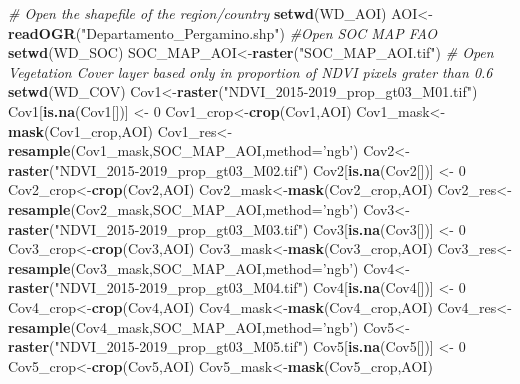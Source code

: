 \documentclass[
  10pt,
  b5paper,
]{book}
\newenvironment{Shaded}{\begin{snugshade}}{\end{snugshade}}
\newcommand{\CommentTok}[1]{\textcolor[rgb]{0.56,0.35,0.01}{\textit{#1}}}
\newcommand{\DataTypeTok}[1]{\textcolor[rgb]{0.13,0.29,0.53}{#1}}
\newcommand{\DecValTok}[1]{\textcolor[rgb]{0.00,0.00,0.81}{#1}}
\newcommand{\KeywordTok}[1]{\textcolor[rgb]{0.13,0.29,0.53}{\textbf{#1}}}
\newcommand{\NormalTok}[1]{#1}
\newcommand{\StringTok}[1]{\textcolor[rgb]{0.31,0.60,0.02}{#1}}
\begin{document}
\begin{Shaded}
\begin{Highlighting}[]
\CommentTok{# Open the shapefile of the region/country}
\KeywordTok{setwd}\NormalTok{(WD_AOI)}
\NormalTok{AOI<-}\KeywordTok{readOGR}\NormalTok{(}\StringTok{"Departamento_Pergamino.shp"}\NormalTok{)}
\CommentTok{#Open SOC MAP FAO}
\KeywordTok{setwd}\NormalTok{(WD_SOC)}
\NormalTok{SOC_MAP_AOI<-}\KeywordTok{raster}\NormalTok{(}\StringTok{"SOC_MAP_AOI.tif"}\NormalTok{)}
\CommentTok{# Open Vegetation Cover layer based only in proportion of NDVI pixels grater than 0.6 }
\KeywordTok{setwd}\NormalTok{(WD_COV)}
\NormalTok{Cov1<-}\KeywordTok{raster}\NormalTok{(}\StringTok{"NDVI_2015-2019_prop_gt03_M01.tif"}\NormalTok{)}
\NormalTok{Cov1[}\KeywordTok{is.na}\NormalTok{(Cov1[])] <-}\StringTok{ }\DecValTok{0}
\NormalTok{Cov1_crop<-}\KeywordTok{crop}\NormalTok{(Cov1,AOI)}
\NormalTok{Cov1_mask<-}\KeywordTok{mask}\NormalTok{(Cov1_crop,AOI)}
\NormalTok{Cov1_res<-}\KeywordTok{resample}\NormalTok{(Cov1_mask,SOC_MAP_AOI,}\DataTypeTok{method=}\StringTok{'ngb'}\NormalTok{) }
\NormalTok{Cov2<-}\KeywordTok{raster}\NormalTok{(}\StringTok{"NDVI_2015-2019_prop_gt03_M02.tif"}\NormalTok{)}
\NormalTok{Cov2[}\KeywordTok{is.na}\NormalTok{(Cov2[])] <-}\StringTok{ }\DecValTok{0}
\NormalTok{Cov2_crop<-}\KeywordTok{crop}\NormalTok{(Cov2,AOI)}
\NormalTok{Cov2_mask<-}\KeywordTok{mask}\NormalTok{(Cov2_crop,AOI)}
\NormalTok{Cov2_res<-}\KeywordTok{resample}\NormalTok{(Cov2_mask,SOC_MAP_AOI,}\DataTypeTok{method=}\StringTok{'ngb'}\NormalTok{) }
\NormalTok{Cov3<-}\KeywordTok{raster}\NormalTok{(}\StringTok{"NDVI_2015-2019_prop_gt03_M03.tif"}\NormalTok{)}
\NormalTok{Cov3[}\KeywordTok{is.na}\NormalTok{(Cov3[])] <-}\StringTok{ }\DecValTok{0}
\NormalTok{Cov3_crop<-}\KeywordTok{crop}\NormalTok{(Cov3,AOI)}
\NormalTok{Cov3_mask<-}\KeywordTok{mask}\NormalTok{(Cov3_crop,AOI)}
\NormalTok{Cov3_res<-}\KeywordTok{resample}\NormalTok{(Cov3_mask,SOC_MAP_AOI,}\DataTypeTok{method=}\StringTok{'ngb'}\NormalTok{) }
\NormalTok{Cov4<-}\KeywordTok{raster}\NormalTok{(}\StringTok{"NDVI_2015-2019_prop_gt03_M04.tif"}\NormalTok{)}
\NormalTok{Cov4[}\KeywordTok{is.na}\NormalTok{(Cov4[])] <-}\StringTok{ }\DecValTok{0}
\NormalTok{Cov4_crop<-}\KeywordTok{crop}\NormalTok{(Cov4,AOI)}
\NormalTok{Cov4_mask<-}\KeywordTok{mask}\NormalTok{(Cov4_crop,AOI)}
\NormalTok{Cov4_res<-}\KeywordTok{resample}\NormalTok{(Cov4_mask,SOC_MAP_AOI,}\DataTypeTok{method=}\StringTok{'ngb'}\NormalTok{) }
\NormalTok{Cov5<-}\KeywordTok{raster}\NormalTok{(}\StringTok{"NDVI_2015-2019_prop_gt03_M05.tif"}\NormalTok{)}
\NormalTok{Cov5[}\KeywordTok{is.na}\NormalTok{(Cov5[])] <-}\StringTok{ }\DecValTok{0}
\NormalTok{Cov5_crop<-}\KeywordTok{crop}\NormalTok{(Cov5,AOI)}
\NormalTok{Cov5_mask<-}\KeywordTok{mask}\NormalTok{(Cov5_crop,AOI)}

\end{Highlighting}
\end{Shaded}
\end{document}
